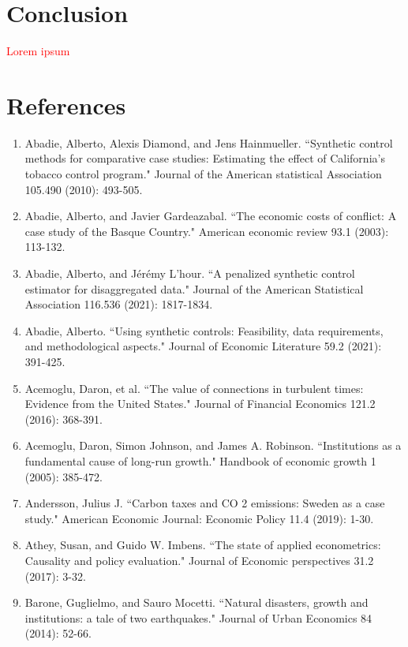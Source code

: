 \documentclass[12pt,a4paper,draft]{article}
\begin{document}
\section{Conclusion}  %
\textcolor{red}{Lorem ipsum}











\newpage



\section{References}  %
\begin{enumerate}
    \item Abadie, Alberto, Alexis Diamond, and Jens Hainmueller. ``Synthetic control methods for comparative case studies: Estimating the effect of California's tobacco control program." Journal of the American statistical Association 105.490 (2010): 493-505.
    \item Abadie, Alberto, and Javier Gardeazabal. ``The economic costs of conflict: A case study of the Basque Country." American economic review 93.1 (2003): 113-132.
    \item Abadie, Alberto, and Jérémy L'hour. ``A penalized synthetic control estimator for disaggregated data." Journal of the American Statistical Association 116.536 (2021): 1817-1834.
    \item Abadie, Alberto. ``Using synthetic controls: Feasibility, data requirements, and methodological aspects." Journal of Economic Literature 59.2 (2021): 391-425.
    \item Acemoglu, Daron, et al. ``The value of connections in turbulent times: Evidence from the United States." Journal of Financial Economics 121.2 (2016): 368-391.
    \item Acemoglu, Daron, Simon Johnson, and James A. Robinson. ``Institutions as a fundamental cause of long-run growth." Handbook of economic growth 1 (2005): 385-472.
    \item Andersson, Julius J. ``Carbon taxes and CO 2 emissions: Sweden as a case study." American Economic Journal: Economic Policy 11.4 (2019): 1-30.
    \item Athey, Susan, and Guido W. Imbens. ``The state of applied econometrics: Causality and policy evaluation." Journal of Economic perspectives 31.2 (2017): 3-32.
    \item Barone, Guglielmo, and Sauro Mocetti. ``Natural disasters, growth and institutions: a tale of two earthquakes." Journal of Urban Economics 84 (2014): 52-66.

\end{enumerate}
\end{document}
